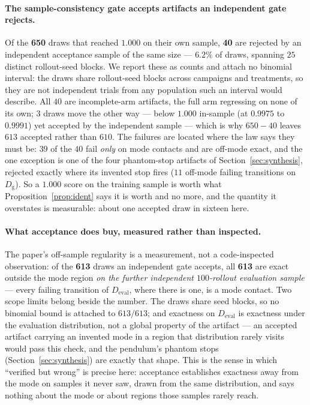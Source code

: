 \documentclass[11pt]{article}
\theoremstyle{definition}
\theoremstyle{remark}
\begin{document}
\paragraph{The sample-consistency gate accepts artifacts an independent gate rejects.} Of the \textbf{650} draws that reached $1.000$ on their own sample, \textbf{40} are rejected by an independent acceptance sample of the same size --- $6.2\%$ of draws, spanning $25$ distinct rollout-seed blocks. We report these as counts and attach no binomial interval: the draws share rollout-seed blocks across campaigns and treatments, so they are not independent trials from any population such an interval would describe. All $40$ are incomplete-arm artifacts, the full arm regressing on none of its own; $3$ draws move the other way --- below $1.000$ in-sample (at $0.9975$ to $0.9991$) yet accepted by the independent sample --- which is why $650 - 40$ leaves $613$ accepted rather than $610$. The failures are located where the law says they must be: $39$ of the $40$ fail \emph{only} on mode contacts and are off-mode exact, and the one exception is one of the four phantom-stop artifacts of Section~\ref{sec:synthesis}, rejected exactly where its invented stop fires ($11$ off-mode failing transitions on $D_{\mathrm{g}}$). So a $1.000$ score on the training sample is worth what Proposition~\ref{prop:ident} says it is worth and no more, and the quantity it overstates is measurable: about one accepted draw in sixteen here.

\paragraph{What acceptance does buy, measured rather than inspected.} The paper's off-sample regularity is a measurement, not a code-inspected observation: of the \textbf{613} draws an independent gate accepts, all \textbf{613} are exact outside the mode region \emph{on the further independent $100$-rollout evaluation sample} --- every failing transition of $D_{\mathrm{eval}}$, where there is one, is a mode contact. Two scope limits belong beside the number. The draws share seed blocks, so no binomial bound is attached to $613/613$; and exactness on $D_{\mathrm{eval}}$ is exactness under the evaluation distribution, not a global property of the artifact --- an accepted artifact carrying an invented mode in a region that distribution rarely visits would pass this check, and the pendulum's phantom stops (Section~\ref{sec:synthesis}) are exactly that shape. This is the sense in which ``verified but wrong'' is precise here: acceptance establishes exactness away from the mode on samples it never saw, drawn from the same distribution, and says nothing about the mode or about regions those samples rarely reach.
\end{document}
